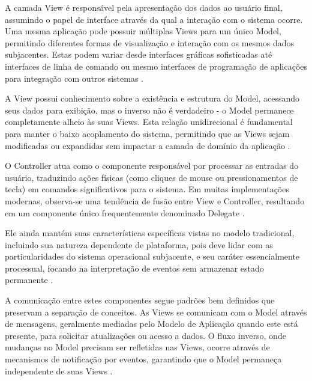     
    \par A camada View é responsável pela apresentação dos dados ao usuário final, assumindo o papel de interface através da qual a interação com o sistema ocorre. Uma mesma aplicação pode possuir múltiplas Views para um único Model, permitindo diferentes formas de visualização e interação com os mesmos dados subjacentes. Estas podem variar desde interfaces gráficas sofisticadas até interfaces de linha de comando ou mesmo interfaces de programação de aplicações para integração com outros sistemas \cite{artigo:deacon:2009}.
    
    \par A View possui conhecimento sobre a existência e estrutura do Model, acessando seus dados para exibição, mas o inverso não é verdadeiro - o Model permanece completamente alheio às suas Views. Esta relação unidirecional é fundamental para manter o baixo acoplamento do sistema, permitindo que as Views sejam modificadas ou expandidas sem impactar a camada de domínio da aplicação \cite{artigo:deacon:2009}.

    \par O Controller atua como o componente responsável por processar as entradas do usuário, traduzindo ações físicas (como cliques de mouse ou pressionamentos de tecla) em comandos significativos para o sistema. Em muitas implementações modernas, observa-se uma tendência de fusão entre View e Controller, resultando em um componente único frequentemente denominado Delegate \cite{artigo:deacon:2009}.
    
    \par Ele ainda mantém suas características específicas vistas no modelo tradicional, incluindo sua natureza dependente de plataforma, pois deve lidar com as particularidades do sistema operacional subjacente, e seu caráter essencialmente processual, focando na interpretação de eventos sem armazenar estado permanente \cite{artigo:deacon:2009}.
        
    
    \par A comunicação entre estes componentes segue padrões bem definidos que preservam a separação de conceitos. As Views se comunicam com o Model através de mensagens, geralmente mediadas pelo Modelo de Aplicação quando este está presente, para solicitar atualizações ou acesso a dados. O fluxo inverso, onde mudanças no Model precisam ser refletidas nas Views, ocorre através de mecanismos de notificação por eventos, garantindo que o Model permaneça independente de suas Views \cite{artigo:deacon:2009}.
    
